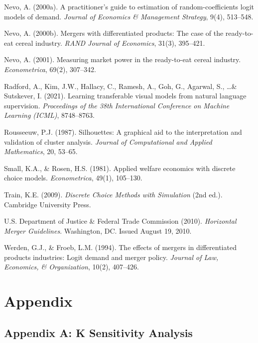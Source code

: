 Nevo, A. (2000a). A practitioner's guide to estimation of
random-coefficients logit models of demand. \emph{Journal of Economics
\& Management Strategy}, 9(4), 513--548.

Nevo, A. (2000b). Mergers with differentiated products: The case of the
ready-to-eat cereal industry. \emph{RAND Journal of Economics}, 31(3),
395--421.

Nevo, A. (2001). Measuring market power in the ready-to-eat cereal
industry. \emph{Econometrica}, 69(2), 307--342.

Radford, A., Kim, J.W., Hallacy, C., Ramesh, A., Goh, G., Agarwal, S.,
\ldots \& Sutskever, I. (2021). Learning transferable visual models from
natural language supervision. \emph{Proceedings of the 38th
International Conference on Machine Learning (ICML)}, 8748--8763.

Rousseeuw, P.J. (1987). Silhouettes: A graphical aid to the
interpretation and validation of cluster analysis. \emph{Journal of
Computational and Applied Mathematics}, 20, 53--65.

Small, K.A., \& Rosen, H.S. (1981). Applied welfare economics with
discrete choice models. \emph{Econometrica}, 49(1), 105--130.

Train, K.E. (2009). \emph{Discrete Choice Methods with Simulation} (2nd
ed.). Cambridge University Press.

U.S. Department of Justice \& Federal Trade Commission (2010).
\emph{Horizontal Merger Guidelines}. Washington, DC. Issued August 19,
2010.

Werden, G.J., \& Froeb, L.M. (1994). The effects of mergers in
differentiated products industries: Logit demand and merger policy.
\emph{Journal of Law, Economics, \& Organization}, 10(2), 407--426.

\clearpage

\chapter*{Appendix}\label{appendix}

\section*{Appendix A: K Sensitivity
Analysis}\label{appendix-a-k-sensitivity-analysis}

